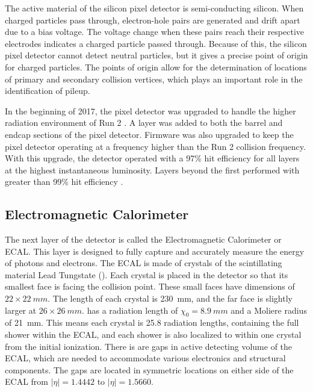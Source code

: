 The active material of the silicon pixel detector is semi-conducting silicon.
When charged particles pass through,
electron-hole pairs are generated and drift apart due to a bias voltage.
The voltage change when these pairs reach their respective electrodes
indicates a charged particle passed through.
Because of this, the silicon pixel detector cannot detect neutral particles,
but it gives a precise point of origin for charged particles.
The points of origin allow for the determination of locations of primary and secondary
collision vertices, which plays an important role in the identification of pileup.

In the beginning of 2017, the pixel detector was upgraded to handle
the higher radiation environment of Run 2 \cite{Dominguez:1481838}.
A layer was added to both the barrel and endcap sections of the pixel detector.
Firmware was also upgraded to keep the pixel detector operating
at a frequency higher than the Run 2 collision frequency.
With this upgrade, the detector operated with a 97\% hit efficiency
for all layers at the highest instantaneous luminosity.
Layers beyond the first performed with greater than 99\% hit efficiency \cite{Modak:2712284}.

\subsection{Electromagnetic Calorimeter} \label{sec:ecal}

The next layer of the detector is called the Electromagnetic Calorimeter or ECAL.
This layer is designed to fully capture and accurately measure
the energy of photons and electrons.
The ECAL is made of crystals of the scintillating material Lead Tungstate ().
Each crystal is placed in the detector so that its smallest face
is facing the collision point.
These small faces have dimensions of $22\times\SI{22}{mm}$.
The length of each crystal is \SI{230}{mm},
and the far face is slightly larger at $26\times\SI{26}{mm}$.
 has a radiation length of $\chi_0 = \SI{8.9}{mm}$ and
a Moliere radius of \SI{21}{mm}.
This means each crystal is 25.8 radiation lengths,
containing the full shower within the ECAL,
and each shower is also localized to within one crystal from the initial ionization.
There is are gaps in active detecting volume of the ECAL,
which are needed to accommodate various electronics and structural components.
The gaps are located in symmetric locations on either side of the ECAL from
$|\eta| = 1.4442$ to $|\eta| = 1.5660$.

